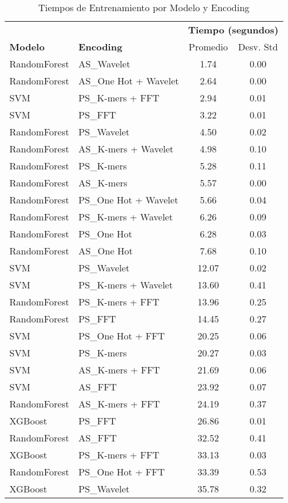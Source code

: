 \begin{table*}[htbp]
\centering
\caption{Tiempos de Entrenamiento por Modelo y Encoding}
\label{tab:training_times}
\scriptsize
\renewcommand{\arraystretch}{1.0}
\begin{tabular}{llcc}
\toprule
& & \multicolumn{2}{c}{\textbf{Tiempo (segundos)}} \\
\cmidrule(lr){3-4}
\textbf{Modelo} & \textbf{Encoding} & Promedio & Desv. Std \\
\midrule
RandomForest & AS\_Wavelet & 1.74 & 0.00 \\
RandomForest & AS\_One Hot + Wavelet & 2.64 & 0.00 \\
SVM & PS\_K-mers + FFT & 2.94 & 0.01 \\
SVM & PS\_FFT & 3.22 & 0.01 \\
RandomForest & PS\_Wavelet & 4.50 & 0.02 \\
RandomForest & AS\_K-mers + Wavelet & 4.98 & 0.10 \\
RandomForest & PS\_K-mers & 5.28 & 0.11 \\
RandomForest & AS\_K-mers & 5.57 & 0.00 \\
RandomForest & PS\_One Hot + Wavelet & 5.66 & 0.04 \\
RandomForest & PS\_K-mers + Wavelet & 6.26 & 0.09 \\
RandomForest & PS\_One Hot & 6.28 & 0.03 \\
RandomForest & AS\_One Hot & 7.68 & 0.10 \\
SVM & PS\_Wavelet & 12.07 & 0.02 \\
SVM & PS\_K-mers + Wavelet & 13.60 & 0.41 \\
RandomForest & PS\_K-mers + FFT & 13.96 & 0.25 \\
RandomForest & PS\_FFT & 14.45 & 0.27 \\
SVM & PS\_One Hot + FFT & 20.25 & 0.06 \\
SVM & PS\_K-mers & 20.27 & 0.03 \\
SVM & AS\_K-mers + FFT & 21.69 & 0.06 \\
SVM & AS\_FFT & 23.92 & 0.07 \\
RandomForest & AS\_K-mers + FFT & 24.19 & 0.37 \\
XGBoost & PS\_FFT & 26.86 & 0.01 \\
RandomForest & AS\_FFT & 32.52 & 0.41 \\
XGBoost & PS\_K-mers + FFT & 33.13 & 0.03 \\
RandomForest & PS\_One Hot + FFT & 33.39 & 0.53 \\
XGBoost & PS\_Wavelet & 35.78 & 0.32 \\

\end{tabular}
\end{table*}
